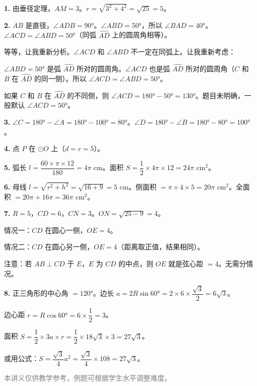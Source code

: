 \documentclass[12pt, a4paper]{ctexart}
\begin{document}
\begin{knowledgebox}[参考答案]

\textbf{1.} 由垂径定理，$AM = 3$。$r = \sqrt{3^2 + 4^2} = \sqrt{25} = 5$。

\medskip
\textbf{2.} $AB$ 是直径，$\angle ADB = 90°$。$\angle ABD = 50°$，所以 $\angle BAD = 40°$。$\angle ACD = \angle ABD = 50°$（同弧 $\widehat{AD}$ 上的圆周角相等）。

等等，让我重新分析。$\angle ACD$ 和 $\angle ABD$ 不一定在同弧上。让我重新考虑：

$\angle ABD = 50°$ 是弧 $\widehat{AD}$ 所对的圆周角。$\angle ACD$ 也是弧 $\widehat{AD}$ 所对的圆周角（$C$ 和 $B$ 在 $\widehat{AD}$ 的同一侧）。所以 $\angle ACD = \angle ABD = 50°$。

如果 $C$ 和 $B$ 在 $\widehat{AD}$ 的不同侧，则 $\angle ACD = 180° - 50° = 130°$。题目未明确，一般默认 $\angle ACD = 50°$。

\medskip
\textbf{3.} $\angle C = 180° - \angle A = 180° - 100° = 80°$。$\angle D = 180° - \angle B = 180° - 80° = 100°$。

\medskip
\textbf{4.} 点 $P$ 在 $\odot O$ 上（$d = r = 5$）。

\medskip
\textbf{5.} 弧长 $l = \dfrac{60 \times \pi \times 12}{180} = 4\pi$ cm。面积 $S = \dfrac{1}{2} \times 4\pi \times 12 = 24\pi$ cm$^2$。

\medskip
\textbf{6.} 母线 $l = \sqrt{r^2 + h^2} = \sqrt{16 + 9} = 5$ cm。侧面积 $= \pi \times 4 \times 5 = 20\pi$ cm$^2$。全面积 $= 20\pi + 16\pi = 36\pi$ cm$^2$。

\medskip
\textbf{7.} $R = 5$，$CD = 6$，$CN = 3$。$ON = \sqrt{25 - 9} = 4$。

情况一：$CD$ 在圆心一侧，$OE = 4$。

情况二：$CD$ 在圆心另一侧，$OE = 4$（距离取正值，结果相同）。

注意：若 $AB \perp CD$ 于 $E$，$E$ 为 $CD$ 的中点，则 $OE$ 就是弦心距 $= 4$。无需分情况。

\medskip
\textbf{8.} 正三角形的中心角 $= 120°$。边长 $a = 2R\sin 60° = 2 \times 6 \times \dfrac{\sqrt{3}}{2} = 6\sqrt{3}$。

边心距 $r = R\cos 60° = 6 \times \dfrac{1}{2} = 3$。

面积 $S = \dfrac{1}{2} \times 3a \times r = \dfrac{1}{2} \times 18\sqrt{3} \times 3 = 27\sqrt{3}$。

或用公式：$S = \dfrac{\sqrt{3}}{4}a^2 = \dfrac{\sqrt{3}}{4} \times 108 = 27\sqrt{3}$。

\end{knowledgebox}

\vfill
\begin{center}
\small\textcolor{gray}{本讲义仅供教学参考，例题可根据学生水平调整难度。}
\end{center}
\end{document}
